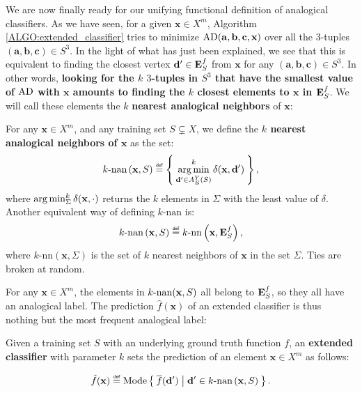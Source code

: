 We are now finally ready for our unifying functional definition of analogical
classifiers. As we have seen, for a given $\mathbf{x} \in X^m$, Algorithm
\ref{ALGO:extended_classifier} tries to minimize
$\text{AD}(\mathbf{a},\mathbf{b},\mathbf{c},\mathbf{x})$ over all the $3$-tuples
$(\mathbf{a},\mathbf{b},\mathbf{c}) \in S^3$. In the light of what has just
been explained, we see that this is equivalent to finding the closest vertex
$\mathbf{d}' \in \mathbf{E}_{S}^{f}$ from $\mathbf{x}$ for any $(\mathbf{a}, \mathbf{b},
\mathbf{c}) \in S^3$. In other words, \textbf{looking for the $k$ $3$-tuples in
$S^3$ that have the smallest value of $\text{AD}$ with $\mathbf{x}$ amounts to
finding the $k$ closest elements to $\mathbf{x}$ in $\mathbf{E}_{S}^{f}$}. We will call these
elements the $k$ \textbf{nearest analogical neighbors} of $\mathbf{x}$:

\begin{definition}
  \label{DEF:knan}
  For any $\mathbf{x} \in X^m$, and any training set $S \subsetneq X$, we define
  the \textbf{$k$ nearest analogical neighbors of $\mathbf{x}$} as the set:
  $$k\text{-nan}\left(\mathbf{x}, S\right) \eqdef \Set{\argmin_{\mathbf{d}' \in
  A_E^Y(S)}^k
  \delta(\mathbf{x},\mathbf{d}')},
  $$
  where $\operatorname*{arg\,min}_{\Sigma}^k \delta(\mathbf{x}, \cdot)$ returns the $k$ elements in $\Sigma$
  with the least value of $\delta$.
  Another equivalent way of defining $k\text{-nan}$ is:
  $$k\text{-nan}\left(\mathbf{x}, S\right) \eqdef k\text{-nn}\left(\mathbf{x},
  \esf\right),$$
  where $k\text{-nn}\left(\mathbf{x},\Sigma\right)$ is the set of $k$ nearest
  neighbors of $\mathbf{x}$ in the set $\Sigma$. Ties are broken at random.
\end{definition}

For any $\mathbf{x} \in X^m$, the elements in $k\text{-nan}(\mathbf{x}, S)$ all belong
to $\mathbf{E}_{S}^{f}$, so they all have an analogical label. The prediction
$\hat{f}(\mathbf{x})$ of an extended classifier is thus nothing but the most
frequent analogical label:

\begin{definition}
  \label{DEF:extended_classifier}
  Given a training set $S$ with an underlying ground truth function $f$,
  an \textbf{extended classifier} with parameter $k$ sets the prediction of an element
  $\mathbf{x} \in X^m$ as follows:

  $$\hat{f}(\mathbf{x}) \eqdef \text{Mode}\Set{\albl{\mathbf{d}'} | \mathbf{d}'
  \in k\text{-nan}\left(\mathbf{x}, S\right)}.
  $$
\end{definition}


